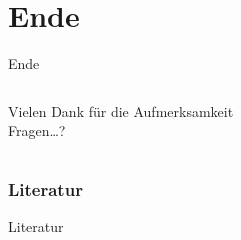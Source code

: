 \documentclass[ngerman,compress,hyperref={bookmarks}]{beamer}
\begin{document}
\part{Ende}
\begin{frame}{Ende}
\begin{columns}[t]
\begin{column}{0.5\textwidth}
 \begin{center}
 \vspace{1cm}
 Vielen Dank für die Aufmerksamkeit\\
 \vspace{1.5cm}
 Fragen\ldots?
 \end{center}
\end{column}
\begin{column}{0.5\textwidth}
 \vspace{-1cm}
 \begin{figure}
  \label{asngraph_all}
 \end{figure}
\end{column}
\end{columns}
\end{frame}

\section{Literatur}
\begin{frame}{Literatur}
\scriptsize

%

\end{frame}
\end{document}
